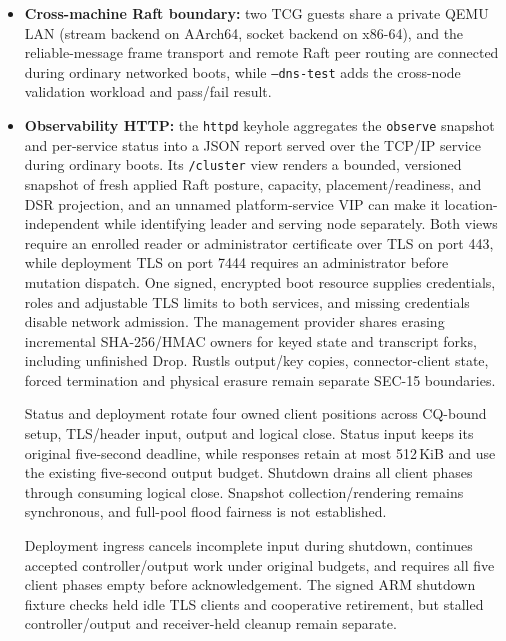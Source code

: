 \begin{itemize}
        Scalar scratch identity, broader factories/destructors, aggregate
        principal metadata, allocator overhead and pressure progress remain open.
    \item \textbf{Cross-machine Raft boundary:} two TCG guests share a private
        QEMU LAN (stream backend on AArch64, socket backend on x86-64), and the
        reliable-message frame transport and remote Raft peer routing are
        connected during ordinary networked boots, while \texttt{--dns-test} adds
        the cross-node validation workload and pass/fail result.
    \item \textbf{Observability HTTP:} the \texttt{httpd} keyhole aggregates the
        \texttt{observe} snapshot and per-service status into a JSON report
        served over the TCP/IP service during ordinary boots.
        Its \texttt{/cluster} view renders a bounded, versioned snapshot of
        fresh applied Raft posture, capacity, placement/readiness, and DSR
        projection, and an unnamed platform-service VIP can make it
        location-independent while identifying leader and serving node
        separately. Both views require an enrolled reader or administrator
        certificate over TLS on port 443, while deployment TLS on port 7444 requires
        an administrator before mutation dispatch. One signed, encrypted boot
        resource supplies credentials, roles and adjustable TLS limits to both
        services, and missing credentials disable network admission.
        The management provider shares erasing incremental SHA-256/HMAC owners
        for keyed state and transcript forks, including unfinished Drop.
        Rustls output/key copies, connector-client state, forced termination and
        physical erasure remain separate SEC-15 boundaries.
        
        Status and deployment rotate four owned client positions across CQ-bound
        setup, TLS/header input, output and logical close. Status input keeps its
        original five-second deadline, while responses retain at most 512\,KiB and
        use the existing five-second output budget. Shutdown drains all client
        phases through consuming logical close. Snapshot collection/rendering
        remains synchronous, and full-pool flood fairness is not established.
        
        Deployment ingress cancels incomplete input during shutdown, continues
        accepted controller/output work under original budgets, and requires
        all five client phases empty before acknowledgement. The signed ARM
        shutdown fixture checks held idle TLS clients and cooperative retirement, but
        stalled controller/output and receiver-held cleanup remain separate.
        

\end{itemize}
